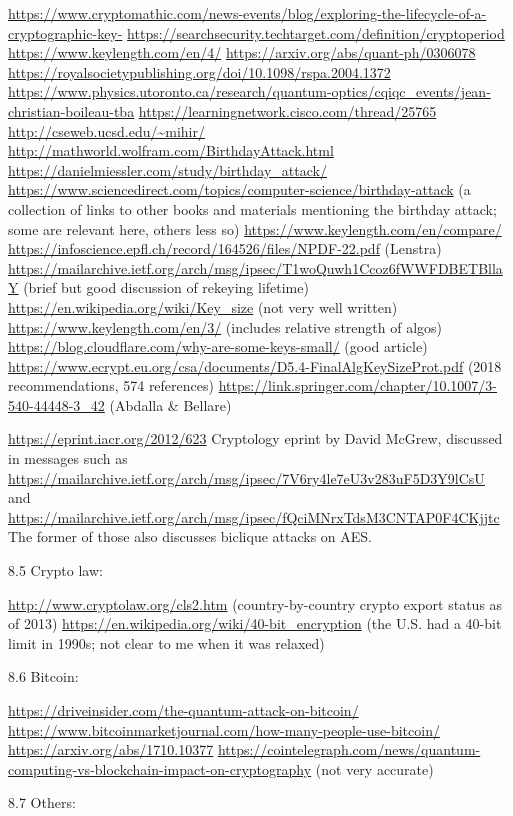 \documentclass[%
 aip,
 jmp,%
 amsmath,amssymb,
 reprint,%
]{revtex4-1}
\begin{document}
\url{https://www.cryptomathic.com/news-events/blog/exploring-the-lifecycle-of-a-cryptographic-key-}
\url{https://searchsecurity.techtarget.com/definition/cryptoperiod}
\url{https://www.keylength.com/en/4/}
\url{https://arxiv.org/abs/quant-ph/0306078}
\url{https://royalsocietypublishing.org/doi/10.1098/rspa.2004.1372}
\url{https://www.physics.utoronto.ca/research/quantum-optics/cqiqc_events/jean-christian-boileau-tba}
\url{https://learningnetwork.cisco.com/thread/25765}
\url{http://cseweb.ucsd.edu/~mihir/}
\url{http://mathworld.wolfram.com/BirthdayAttack.html}
\url{https://danielmiessler.com/study/birthday_attack/}
\url{https://www.sciencedirect.com/topics/computer-science/birthday-attack}
(a collection of links to other books and materials mentioning the
birthday attack; some are relevant here, others less so)
\url{https://www.keylength.com/en/compare/}
\url{https://infoscience.epfl.ch/record/164526/files/NPDF-22.pdf} (Lenstra)
\url{https://mailarchive.ietf.org/arch/msg/ipsec/T1woQuwh1Ccoz6fWWFDBETBllaY}
(brief but good discussion of rekeying lifetime)
\url{https://en.wikipedia.org/wiki/Key_size} (not very well written)
\url{https://www.keylength.com/en/3/} (includes relative strength of algos)
\url{https://blog.cloudflare.com/why-are-some-keys-small/} (good article)
\url{https://www.ecrypt.eu.org/csa/documents/D5.4-FinalAlgKeySizeProt.pdf}
(2018 recommendations, 574 references)
\url{https://link.springer.com/chapter/10.1007/3-540-44448-3_42} (Abdalla \& Bellare)

\url{https://eprint.iacr.org/2012/623}
Cryptology eprint by David McGrew,
discussed in messages such as
\url{https://mailarchive.ietf.org/arch/msg/ipsec/7V6ry4le7eU3v283uF5D3Y9lCsU}
and
\url{https://mailarchive.ietf.org/arch/msg/ipsec/fQciMNrxTdsM3CNTAP0F4CKjjtc}
The former of those also discusses biclique attacks on AES.

8.5 Crypto law:

\url{http://www.cryptolaw.org/cls2.htm}
(country-by-country crypto export
status as of 2013)
\url{https://en.wikipedia.org/wiki/40-bit_encryption}
(the U.S. had a 40-bit
limit in 1990s; not clear to me when it was relaxed)

8.6 Bitcoin:

\url{https://driveinsider.com/the-quantum-attack-on-bitcoin/}
\url{https://www.bitcoinmarketjournal.com/how-many-people-use-bitcoin/}
\url{https://arxiv.org/abs/1710.10377}
\url{https://cointelegraph.com/news/quantum-computing-vs-blockchain-impact-on-cryptography}
(not very accurate)

8.7 Others:
\end{document}
